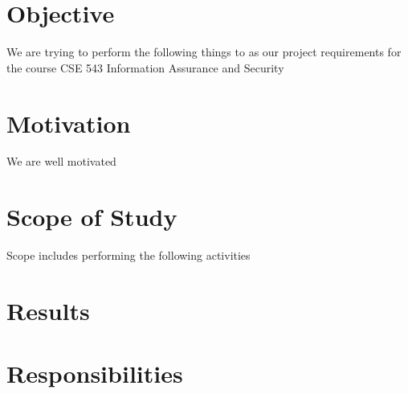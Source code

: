 \documentclass[11pt]{article}
\title{\fulltitle}
\begin{document}
	\maketitle
	\author{Tejas Khairnar Sujay Vaishampayan Harshil Maskai Zhibo Sun Aloma Lopes\\
	Arizona State University}
	\section{Objective}
	We are trying to perform the following things to as our project requirements for the course CSE 543 Information Assurance and Security
	
	\section{Motivation}
	We are well motivated
	
	\section{Scope of Study}
	Scope includes performing the following activities
	
	\section{Results}
	
	\section{Responsibilities}
	\begin{table*}[t]
		\centering
		\begin{tabular}{lrrrrrrr}
			\hline
		\end{tabular}
	\end{table*}
	
\end{document}
